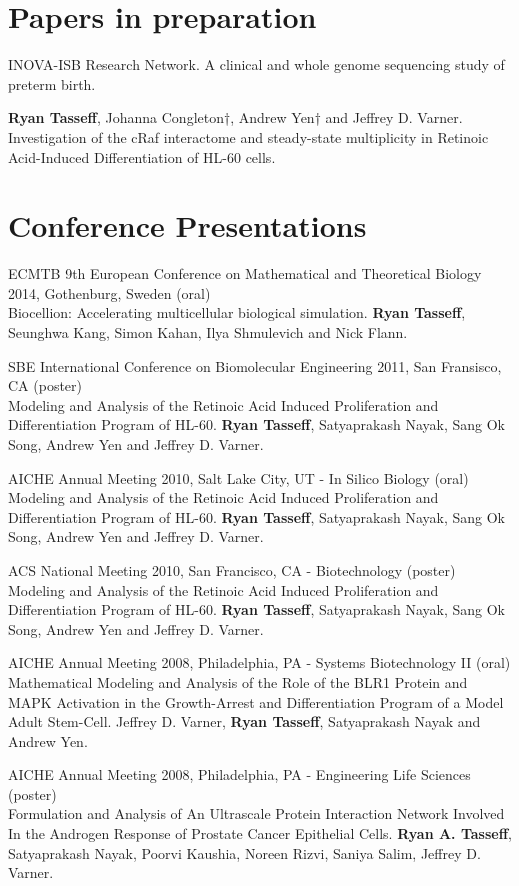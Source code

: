 \documentclass[margin,line]{res}
\begin{document}
\begin{resume}
\section{\sc Papers in preparation}
INOVA-ISB Research Network.
A clinical and whole genome sequencing study of preterm birth.

{\bf Ryan Tasseff}, Johanna Congleton†, Andrew Yen† and Jeffrey D. Varner.
Investigation of the cRaf interactome and steady-state multiplicity in 
Retinoic Acid-Induced Differentiation of HL-60 cells.

\section{\sc Conference Presentations}
ECMTB 9th European Conference on Mathematical and Theoretical Biology 2014, Gothenburg, Sweden (oral) \\
Biocellion: Accelerating multicellular biological simulation.
{\bf Ryan Tasseff}, Seunghwa Kang, Simon Kahan, Ilya Shmulevich and Nick Flann.

SBE International Conference on Biomolecular Engineering 2011, San Fransisco, CA (poster)\\
Modeling and Analysis of the Retinoic Acid Induced Proliferation and Differentiation Program of HL-60.
{\bf Ryan Tasseff}, Satyaprakash Nayak, Sang Ok Song, Andrew Yen and Jeffrey D. Varner.

AICHE Annual Meeting 2010, Salt Lake City, UT - In Silico Biology (oral) \\
Modeling and Analysis of the Retinoic Acid Induced Proliferation and Differentiation Program of HL-60.
{\bf Ryan Tasseff}, Satyaprakash Nayak, Sang Ok Song, Andrew Yen and Jeffrey D. Varner.

ACS National Meeting 2010, San Francisco, CA - Biotechnology (poster)\\
Modeling and Analysis of the Retinoic Acid Induced Proliferation and Differentiation Program of HL-60.
{\bf Ryan Tasseff}, Satyaprakash Nayak, Sang Ok Song, Andrew Yen and Jeffrey D. Varner.

AICHE Annual Meeting 2008, Philadelphia, PA - Systems Biotechnology II (oral)\\
Mathematical Modeling and Analysis of the Role of the BLR1 Protein and MAPK Activation 
in the Growth-Arrest and Differentiation Program of a Model Adult Stem-Cell.
Jeffrey D. Varner, {\bf Ryan Tasseff}, Satyaprakash Nayak and Andrew Yen.

AICHE Annual Meeting 2008, Philadelphia, PA - Engineering Life Sciences (poster)\\
Formulation and Analysis of An Ultrascale Protein Interaction Network Involved In the Androgen Response of 
Prostate Cancer Epithelial Cells.
{\bf Ryan A. Tasseff}, Satyaprakash Nayak, Poorvi Kaushia, Noreen Rizvi, Saniya Salim, Jeffrey D. Varner.


\end{resume}
\end{document}
